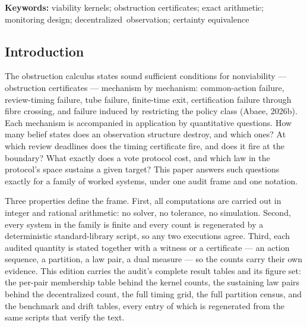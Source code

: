 \documentclass[10pt,twocolumn]{article}
\theoremstyle{definition}
\begin{document}
\begin{abstract}
Farkas pair, and a Helly-tight triple exhibits the sparse \(m{+}1\)-point
witness. The complete result tables are carried here: the master table
of all 36 belief pairs against the five kernels, the sixteen sustaining
law pairs of the decentralized protocol (an exact \(4 \times 4\)
product), the 48-cell timing grid, the fifteen-partition census with
each fibre's common safe-action set, and the benchmark and drift tables,
with a five-figure set regenerated from the same scripts. Design rules
follow: review deadlines are boundary-inclusive; merged fibres call for
splits, not threshold tuning; aggregated indices support certainly-safe
reporting only; biased observation maps call for structural correction.
\end{abstract}

\textbf{Keywords:} viability kernels; obstruction certificates; exact
arithmetic; monitoring design; \mbox{decentralized observation}; certainty
equivalence

\subsection{Introduction}\label{introduction}

The obstruction calculus states sound sufficient conditions for
nonviability --- obstruction certificates --- mechanism by mechanism:
common-action failure, review-timing failure, tube failure, finite-time
exit, certification failure through fibre crossing, and failure induced
by restricting the policy class (Abaee, 2026b). Each mechanism is
accompanied in application by quantitative questions. How many belief
states does an observation structure destroy, and which ones? At which
review deadlines does the timing certificate fire, and does it fire at
the boundary? What exactly does a vote protocol cost, and which law in
the protocol's space sustains a given target? This paper answers such
questions exactly for a family of worked systems, under one audit frame
and one notation.

Three properties define the frame. First, all computations are carried
out in integer and rational arithmetic: no solver, no tolerance, no
simulation. Second, every system in the family is finite and every count
is regenerated by a deterministic standard-library script, so any two
executions agree. Third, each audited quantity is stated together with a
witness or a certificate --- an action sequence, a partition, a law
pair, a dual measure --- so the counts carry their own evidence. This
edition carries the audit's complete result tables and its figure set:
the per-pair membership table behind the kernel counts, the sustaining
law pairs behind the decentralized count, the full timing grid, the full
partition census, and the benchmark and drift tables, every entry of
which is regenerated from the same scripts that verify the text.
\end{document}
